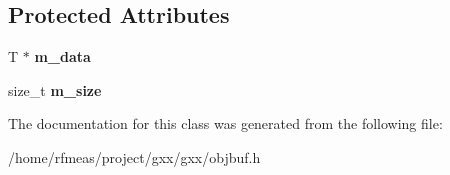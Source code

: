 \subsection*{Protected Attributes}
\begin{DoxyCompactItemize}
\item 
T $\ast$ {\bfseries m\+\_\+data}\hypertarget{classgxx_1_1object__buffer_a04f06836f43c0f3d846951bc29d1e492}{}\label{classgxx_1_1object__buffer_a04f06836f43c0f3d846951bc29d1e492}

\item 
size\+\_\+t {\bfseries m\+\_\+size}\hypertarget{classgxx_1_1object__buffer_a0a84caa37e2495df788f34fd351bcbd3}{}\label{classgxx_1_1object__buffer_a0a84caa37e2495df788f34fd351bcbd3}

\end{DoxyCompactItemize}


The documentation for this class was generated from the following file\+:\begin{DoxyCompactItemize}
\item 
/home/rfmeas/project/gxx/gxx/objbuf.\+h\end{DoxyCompactItemize}
